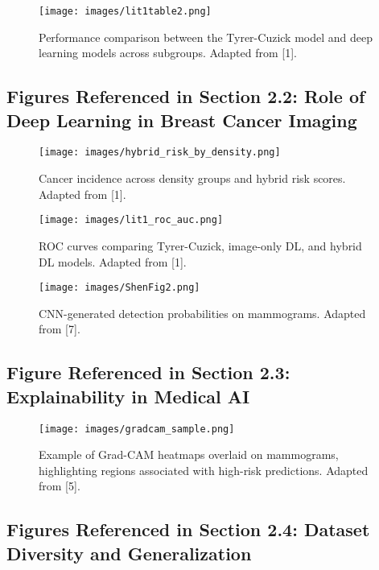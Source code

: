 \documentclass[12pt]{article}
\begin{document}
\begin{figure}[H]
    \centering
    \texttt{[image: images/lit1table2.png]}
    \caption{Performance comparison between the Tyrer-Cuzick model and deep learning models across subgroups. Adapted from [1].}
    \label{fig:lit1table2}
\end{figure}

\subsection{Figures Referenced in Section 2.2: Role of Deep Learning in Breast Cancer Imaging}

\begin{figure}[H]
    \centering
    \texttt{[image: images/hybrid\_risk\_by\_density.png]}
    \caption{Cancer incidence across density groups and hybrid risk scores. Adapted from [1].}
    \label{fig:hybrid_density}
\end{figure}

\begin{figure}[H]
    \centering
    \texttt{[image: images/lit1\_roc\_auc.png]}
    \caption{ROC curves comparing Tyrer-Cuzick, image-only DL, and hybrid DL models. Adapted from [1].}
    \label{fig:lit1roc}
\end{figure}

\begin{figure}[H]
    \centering
    \texttt{[image: images/ShenFig2.png]}
    \caption{CNN-generated detection probabilities on mammograms. Adapted from [7].}
    \label{fig:shen2019}
\end{figure}

\subsection{Figure Referenced in Section 2.3: Explainability in Medical AI}

\begin{figure}[H]
    \centering
    \texttt{[image: images/gradcam\_sample.png]}
    \caption{Example of Grad-CAM heatmaps overlaid on mammograms, highlighting regions associated with high-risk predictions. Adapted from [5].}
    \label{fig:gradcam}
\end{figure}

\subsection{Figures Referenced in Section 2.4: Dataset Diversity and Generalization}
\end{document}
